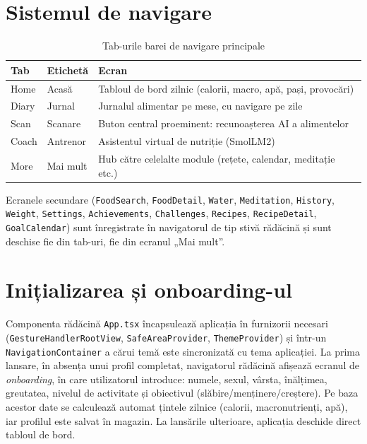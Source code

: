 \documentclass[12pt, a4paper, twoside]{report}
\numberwithin{equation}{section}
\begin{document}
\section{Sistemul de navigare}

\begin{table}[H]
\centering
\caption{Tab-urile barei de navigare principale}
\label{tab:navigare}
\begin{tabularx}{\textwidth}{llX}
\toprule
\textbf{Tab} & \textbf{Etichetă} & \textbf{Ecran} \\
\midrule
Home & Acasă & Tabloul de bord zilnic (calorii, macro, apă, pași, provocări) \\
Diary & Jurnal & Jurnalul alimentar pe mese, cu navigare pe zile \\
Scan & Scanare & Buton central proeminent: recunoașterea AI a alimentelor \\
Coach & Antrenor & Asistentul virtual de nutriție (SmolLM2) \\
More & Mai mult & Hub către celelalte module (rețete, calendar, meditație etc.) \\
\bottomrule
\end{tabularx}
\end{table}

Ecranele secundare (\texttt{FoodSearch}, \texttt{FoodDetail}, \texttt{Water},
\texttt{Meditation}, \texttt{History}, \texttt{Weight}, \texttt{Settings},
\texttt{Achievements}, \texttt{Challenges}, \texttt{Recipes}, \texttt{RecipeDetail},
\texttt{GoalCalendar}) sunt înregistrate în navigatorul de tip stivă rădăcină și sunt
deschise fie din tab-uri, fie din ecranul „Mai mult''.

\section{Inițializarea și onboarding-ul}

Componenta rădăcină \texttt{App.tsx} încapsulează aplicația în furnizorii necesari
(\texttt{GestureHandlerRootView}, \texttt{SafeAreaProvider}, \texttt{ThemeProvider}) și
într-un \texttt{NavigationContainer} a cărui temă este sincronizată cu tema aplicației. La
prima lansare, în absența unui profil completat, navigatorul rădăcină afișează ecranul de
\textit{onboarding}, în care utilizatorul introduce: numele, sexul, vârsta, înălțimea,
greutatea, nivelul de activitate și obiectivul (slăbire/menținere/creștere). Pe baza acestor
date se calculează automat țintele zilnice (calorii, macronutrienți, apă), iar profilul este
salvat în magazin. La lansările ulterioare, aplicația deschide direct tabloul de bord.
\end{document}
